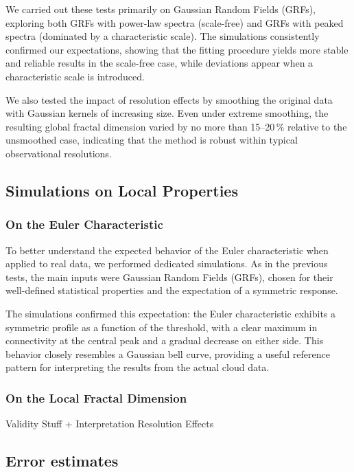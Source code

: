 We carried out these tests primarily on Gaussian Random Fields (GRFs), exploring both GRFs with power-law spectra (scale-free) and GRFs with peaked spectra (dominated by a characteristic scale).  
The simulations consistently confirmed our expectations, showing that the fitting procedure yields more stable and reliable results in the scale-free case, while deviations appear when a characteristic scale is introduced.

We also tested the impact of resolution effects by smoothing the original data with Gaussian kernels of increasing size.  
Even under extreme smoothing, the resulting global fractal dimension varied by no more than 15--20\,\% relative to the unsmoothed case, indicating that the method is robust within typical observational resolutions. 

\subsection{Simulations on Local Properties}

\subsubsection{On the Euler Characteristic}

To better understand the expected behavior of the Euler characteristic when applied to real data, we performed dedicated simulations.  
As in the previous tests, the main inputs were Gaussian Random Fields (GRFs), chosen for their well-defined statistical properties and the expectation of a symmetric response.  

The simulations confirmed this expectation: the Euler characteristic exhibits a symmetric profile as a function of the threshold, with a clear maximum in connectivity at the central peak and a gradual decrease on either side.  
This behavior closely resembles a Gaussian bell curve, providing a useful reference pattern for interpreting the results from the actual cloud data.

\subsubsection{On the Local Fractal Dimension}
Validity Stuff + Interpretation
Resolution Effects

\subsection{Error estimates}

